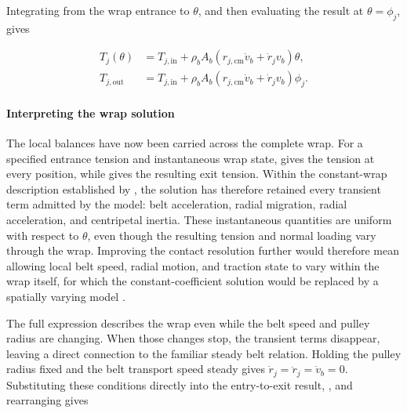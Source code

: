 \documentclass[11pt]{report}
\numberwithin{equation}{section}
\newcounter{assump}
\begin{document}
Integrating from the wrap entrance to \(\theta\), and then evaluating the
result at \(\theta=\phi_j\), gives

\begin{equation}
    \begin{aligned}
        T_j(\theta)
        &=
        T_{j,\mathrm{in}}
        +
        \rho_bA_b
        \left(
            r_{j,\mathrm{cm}}\dot v_b+
            \dot r_jv_b
        \right)\theta,
        \\
        T_{j,\mathrm{out}}
        &=
        T_{j,\mathrm{in}}
        +
        \rho_bA_b
        \left(
            r_{j,\mathrm{cm}}\dot v_b+
            \dot r_jv_b
        \right)\phi_j.
    \end{aligned}
    \label{eq:wrap_zero_traction_solution}
\end{equation}

\paragraph{Interpreting the wrap solution}

The local balances have now been carried across the complete wrap. For a
specified entrance tension and instantaneous wrap state,
 gives the tension at every position, while
 gives the resulting exit tension. Within the
constant-wrap description established by
, the solution has therefore retained
every transient term admitted by the model: belt acceleration, radial
migration, radial acceleration, and centripetal inertia. These instantaneous
quantities are uniform with respect to \(\theta\), even though the resulting
tension and normal loading vary through the wrap. Improving the contact
resolution further would therefore mean allowing local belt speed, radial
motion, and traction state to vary within the wrap itself, for which the
constant-coefficient solution would be replaced by a spatially varying model
\citep{KongParker2006,Messick2018,JulioPlante2011}.

The full expression describes the wrap even while the belt speed and pulley
radius are changing. When those changes stop, the transient terms disappear,
leaving a direct connection to the familiar steady belt relation. Holding the
pulley radius fixed and the belt transport speed steady gives
\(\dot r_j=\ddot r_j=\dot v_b=0\). Substituting these conditions directly into
the entry-to-exit result, , and rearranging
gives
\end{document}

